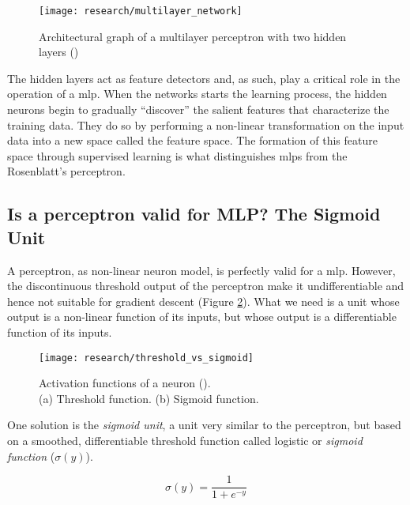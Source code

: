 \begin{figure}[!ht]
	\centering
	\texttt{[image: research/multilayer\_network]}
	\caption{Architectural graph of a multilayer perceptron with two hidden layers (\cite{haykin2009neural})}
	\label{fig:mlp_architectural_graph}
\end{figure}

The hidden layers act as feature detectors and, as such, play a critical role in the operation of a \gls{mlp}. When the networks starts the learning process, the hidden neurons begin to gradually “discover” the salient features that characterize the training data. They do so by performing a non-linear transformation on
the input data into a new space called the feature space. The formation of this feature space through supervised learning is what distinguishes \glspl{mlp} from the Rosenblatt’s perceptron.

	\subsection{Is a perceptron valid for MLP? The Sigmoid Unit}
	A perceptron, as non-linear neuron model, is perfectly valid for a \gls{mlp}. However, the discontinuous threshold output of the perceptron make it undifferentiable and hence not suitable for gradient descent (Figure \ref{fig:threshold_vs_sigmoid}). What we need is a unit whose output is a non-linear function of its inputs, but whose output is a differentiable function of its inputs. 

	\begin{figure}[!ht]
		\centering
		\vspace{0.3cm}
		\texttt{[image: research/threshold\_vs\_sigmoid]}
		\caption
		{
			Activation functions of a neuron (\cite{haykin2009neural}). \\
			(a) Threshold function. \hspace{1.5cm} (b) Sigmoid function.
		}
		\label{fig:threshold_vs_sigmoid}
	\end{figure}

	\clearpage

	One solution is the \textit{sigmoid unit}, a unit very similar to the perceptron, but based on a smoothed, differentiable threshold function called logistic or \textit{sigmoid function} ($\sigma(y)$).
	
	\begin{equation}
		\label{sigmoid_function}
		\sigma(y) = \frac{1}{1+e^{-y}}
	\end{equation}

